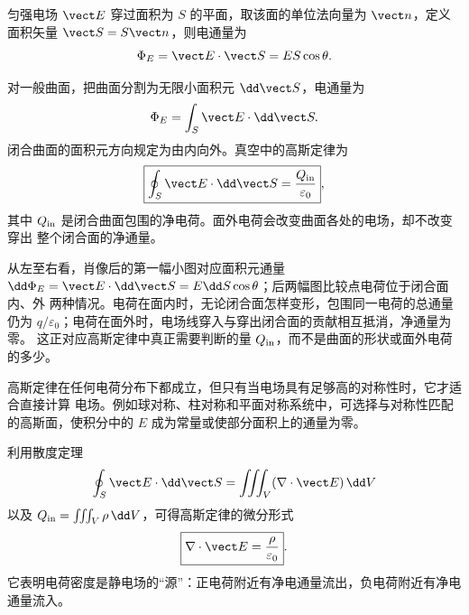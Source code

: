 匀强电场 $\vect E$ 穿过面积为 $S$ 的平面，取该面的单位法向量为 $\vect n$，定义面积矢量
$\vect S=S\vect n$，则电通量为
\begin{equation}
  \Phi_E=\vect E\cdot\vect S=ES\cos\theta.
\end{equation}

\fluxDiagram

对一般曲面，把曲面分割为无限小面积元 $\dd\vect S$，电通量为
\begin{equation}
  \Phi_E=\int_S\vect E\cdot\dd\vect S.
\end{equation}
闭合曲面的面积元方向规定为由内向外。真空中的高斯定律为
\begin{equation}
  \boxed{\oint_S\vect E\cdot\dd\vect S
  =\frac{Q_{\rm in}}{\varepsilon_0}},
\end{equation}
其中 $Q_{\rm in}$ 是闭合曲面包围的净电荷。面外电荷会改变曲面各处的电场，却不改变穿出
整个闭合面的净通量。

\gaussDiagram

\gaussContextDiagram

从左至右看，肖像后的第一幅小图对应面积元通量
$\dd\Phi_E=\vect E\cdot\dd\vect S=E\dd S\cos\theta$；后两幅图比较点电荷位于闭合面内、外
两种情况。电荷在面内时，无论闭合面怎样变形，包围同一电荷的总通量仍为
$q/\varepsilon_0$；电荷在面外时，电场线穿入与穿出闭合面的贡献相互抵消，净通量为零。
这正对应高斯定律中真正需要判断的量 $Q_{\rm in}$，而不是曲面的形状或面外电荷的多少。

高斯定律在任何电荷分布下都成立，但只有当电场具有足够高的对称性时，它才适合直接计算
电场。例如球对称、柱对称和平面对称系统中，可选择与对称性匹配的高斯面，使积分中的
$E$ 成为常量或使部分面积上的通量为零。

利用散度定理
\begin{equation}
  \oint_S\vect E\cdot\dd\vect S
  =\iiint_V(\nabla\cdot\vect E)\,\dd V
\end{equation}
以及 $Q_{\rm in}=\iiint_V\rho\,\dd V$，可得高斯定律的微分形式
\begin{equation}
  \boxed{\nabla\cdot\vect E=\frac{\rho}{\varepsilon_0}}.
\end{equation}
它表明电荷密度是静电场的“源”：正电荷附近有净电通量流出，负电荷附近有净电通量流入。

\gaussDifferentialCubeDiagram





